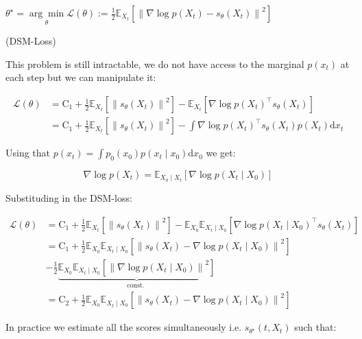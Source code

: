 \documentclass[10pt]{article}
\begin{document}
$\theta^{\star}=\underset{\theta}{\arg \min } \mathcal{L}(\theta):=\frac{1}{2} \mathbb{E}_{X_{t}}\left[\left\|\nabla \log p\left(X_{t}\right)-s_{\theta}\left(X_{t}\right)\right\|^{2}\right]$

(DSM-Loss)

This problem is still intractable, we do not have access to the marginal $p\left(x_{t}\right)$ at each step but we can manipulate it:

$$
\begin{aligned}
\mathcal{L}(\theta) & =\mathrm{C}_{1}+\frac{1}{2} \mathbb{E}_{X_{t}}\left[\left\|s_{\theta}\left(X_{t}\right)\right\|^{2}\right]-\mathbb{E}_{X_{t}}\left[\nabla \log p\left(X_{t}\right)^{\top} s_{\theta}\left(X_{t}\right)\right] \\
& =\mathrm{C}_{1}+\frac{1}{2} \mathbb{E}_{X_{t}}\left[\left\|s_{\theta}\left(X_{t}\right)\right\|^{2}\right]-\int \nabla \log p\left(X_{t}\right)^{\top} s_{\theta}\left(X_{t}\right) p\left(X_{t}\right) \mathrm{d} x_{t}
\end{aligned}
$$

Using that $p\left(x_{t}\right)=\int p_{0}\left(x_{0}\right) p\left(x_{t} \mid x_{0}\right) \mathrm{d} x_{0}$ we get:

$$
\nabla \log p\left(X_{t}\right)=\mathbb{E}_{X_{0} \mid X_{t}}\left[\nabla \log p\left(X_{t} \mid X_{0}\right)\right]
$$

Substituding in the DSM-loss:

$$
\begin{aligned}
\mathcal{L}(\theta) & =\mathrm{C}_{1}+\frac{1}{2} \mathbb{E}_{X_{t}}\left[\left\|s_{\theta}\left(X_{t}\right)\right\|^{2}\right]-\mathbb{E}_{X_{0}} \mathbb{E}_{X_{t} \mid X_{0}}\left[\nabla \log p\left(X_{t} \mid X_{0}\right)^{\top} s_{\theta}\left(X_{t}\right)\right] \\
& =\mathrm{C}_{1}+\frac{1}{2} \mathbb{E}_{X_{0}} \mathbb{E}_{X_{t} \mid X_{0}}\left[\left\|s_{\theta}\left(X_{t}\right)-\nabla \log p\left(X_{t} \mid X_{0}\right)\right\|^{2}\right] \\
& -\frac{1}{2} \underbrace{\mathbb{E}_{X_{0}} \mathbb{E}_{X_{t} \mid X_{0}}\left[\left\|\nabla \log p\left(X_{t} \mid X_{0}\right)\right\|^{2}\right]}_{\text {const. }} \\
& =\mathrm{C}_{2}+\frac{1}{2} \mathbb{E}_{X_{0}} \mathbb{E}_{X_{t} \mid X_{0}}\left[\left\|s_{\theta}\left(X_{t}\right)-\nabla \log p\left(X_{t} \mid X_{0}\right)\right\|^{2}\right]
\end{aligned}
$$

In practice we estimate all the scores simultaneously i.e. $s_{\theta^{\star}}\left(t, X_{t}\right)$ such that:
\end{document}
